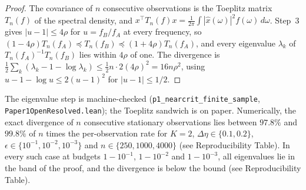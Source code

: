 \begin{proof}
The covariance of $n$ consecutive observations is the Toeplitz matrix $T_n(f)$ of the spectral density, and $x^\top T_n(f)x=\frac1{2\pi}\int|\hat x(\omega)|^2f(\omega)\,d\omega$. Step~3 gives $|u-1|\le4\rho$ for $u=f_B/f_A$ at every frequency, so $(1-4\rho)T_n(f_A)\preceq T_n(f_B)\preceq(1+4\rho)T_n(f_A)$, and every eigenvalue $\lambda_k$ of $T_n(f_A)^{-1}T_n(f_B)$ lies within $4\rho$ of one. The divergence is $\frac12\sum_k(\lambda_k-1-\log\lambda_k)\le\frac12n\cdot2(4\rho)^2=16n\rho^2$, using $u-1-\log u\le2(u-1)^2$ for $|u-1|\le1/2$.
\end{proof}

The eigenvalue step is machine-checked (\texttt{p1\_nearcrit\_finite\_sample}, \nolinkurl{Paper1OpenResolved.lean}); the Toeplitz sandwich is on paper. Numerically, the exact divergence of $n$ consecutive stationary observations lies between $97.8\%$ and $99.8\%$ of $n$ times the per-observation rate for $K=2$, $\Delta\eta\in\{0.1,0.2\}$, $\epsilon\in\{10^{-1},10^{-2},10^{-3}\}$ and $n\in\{250,1000,4000\}$ (see Reproducibility Table). In every such case at budgets $1-10^{-1}$, $1-10^{-2}$ and $1-10^{-3}$, all eigenvalues lie in the band of the proof, and the divergence is below the bound (see Reproducibility Table).
